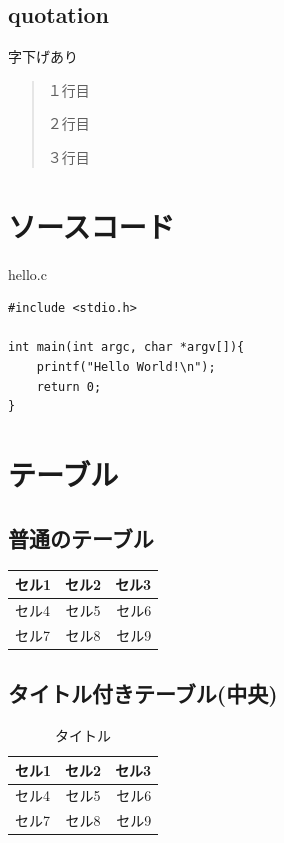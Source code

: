 \documentclass[a4paper,onecolumn,12pt]{jsarticle}
\begin{document}
\subsection{quotation}
字下げあり
\begin{quotation}
１行目

２行目

３行目
\end{quotation}

\section{ソースコード}


hello.c

\begin{verbatim}
#include <stdio.h>

int main(int argc, char *argv[]){
    printf("Hello World!\n");
    return 0;
}
\end{verbatim}

\section{テーブル}
\subsection{普通のテーブル}
\begin{tabular}{|l|c|r|}
\hline
セル1 & セル2 & セル3 \\ \hline
セル4 & セル5 & セル6 \\ \hline
セル7 & セル8 & セル9 \\ \hline
\end{tabular}

\subsection{タイトル付きテーブル(中央)}

\begin{table}[htbp]
\begin{center}
\begin{tabular}{|l|c|r|}
\hline
セル1 & セル2 & セル3 \\ \hline
セル4 & セル5 & セル6 \\ \hline
セル7 & セル8 & セル9 \\ \hline
\end{tabular}
\caption{タイトル}
\end{center}
\end{table}
\end{document}
